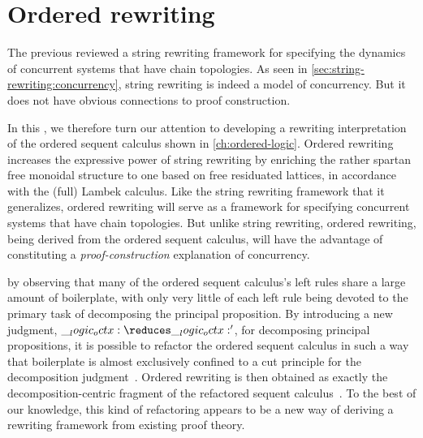 \chapter{Ordered rewriting}\label{ch:ordered-rewriting}

The previous  reviewed a string rewriting framework for specifying the dynamics of concurrent systems that have chain topologies.
As seen in \cref{sec:string-rewriting:concurrency}, string rewriting is indeed a model of concurrency.
But it does not have obvious connections to proof construction.

In this , we therefore turn our attention to developing a rewriting interpretation of the ordered sequent calculus shown in \cref{ch:ordered-logic}.
Ordered rewriting increases the expressive power of string rewriting by enriching the rather spartan free monoidal structure to one based on free residuated lattices, in accordance with the (full) Lambek calculus\autocites{Lambek:AMM58}{Lambek:SLIM61}{Abrusci:MLQ90}{Kanazawa:LLI92}{Polakow+Pfenning:MFPS99}.
Like the string rewriting framework that it generalizes, ordered rewriting will serve as a framework for specifying concurrent systems that have chain topologies.
But unlike string rewriting, ordered rewriting, being derived from the ordered sequent calculus, will have the advantage of constituting a \emph{proof-construction} explanation of concurrency.

 by observing that many of the ordered sequent calculus's left rules share a large amount of boilerplate, with only very little of each left rule being devoted to the primary task of decomposing the principal proposition.
By introducing a new judgment, $\octx \reduces \octx'$, for decomposing principal propositions, it is possible to refactor the ordered sequent calculus in such a way that boilerplate is almost exclusively confined to a cut principle for the decomposition judgment~.
Ordered rewriting is then obtained as exactly the decomposition-centric fragment of the refactored sequent calculus~.
To the best of our knowledge, this kind of refactoring appears to be a new way of deriving a rewriting framework from existing proof theory.

